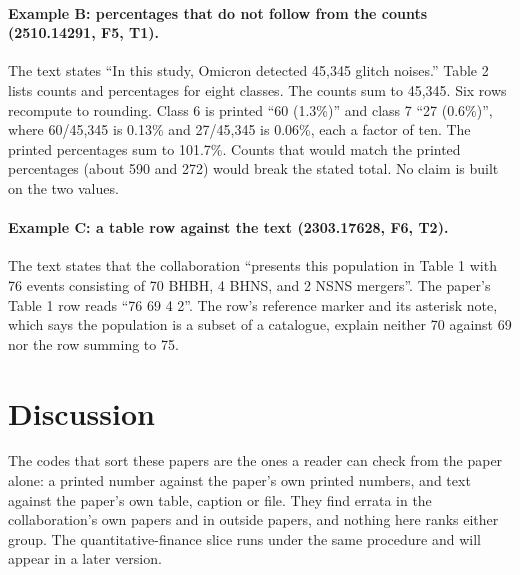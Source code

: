 \documentclass[reprint,amsmath,amssymb,aps,superscriptaddress,nofootinbib]{revtex4-2}
\begin{document}
\paragraph*{Example B: percentages that do not follow from the counts (2510.14291, F5, T1).} The text states ``In this study, Omicron detected 45,345 glitch noises.'' Table 2 lists counts and percentages for eight classes. The counts sum to 45,345. Six rows recompute to rounding. Class 6 is printed ``60 (1.3\%)'' and class 7 ``27 (0.6\%)'', where 60/45,345 is 0.13\% and 27/45,345 is 0.06\%, each a factor of ten. The printed percentages sum to 101.7\%. Counts that would match the printed percentages (about 590 and 272) would break the stated total. No claim is built on the two values.

\paragraph*{Example C: a table row against the text (2303.17628, F6, T2).} The text states that the collaboration ``presents this population in Table 1 with 76 events consisting of 70 BHBH, 4 BHNS, and 2 NSNS mergers''. The paper's Table 1 row reads ``76 69 4 2''. The row's reference marker and its asterisk note, which says the population is a subset of a catalogue, explain neither 70 against 69 nor the row summing to 75.

\section{Discussion}

The codes that sort these papers are the ones a reader can check from the paper alone: a printed number against the paper's own printed numbers, and text against the paper's own table, caption or file. They find errata in the collaboration's own papers and in outside papers, and nothing here ranks either group. The quantitative-finance slice runs under the same procedure and will appear in a later version.
\end{document}
